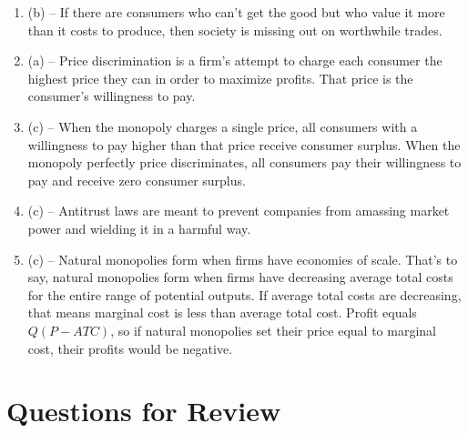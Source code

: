 \documentclass{article}
\begin{document}
\begin{enumerate}
\item (b) -- If there are consumers who can't get the good but who value it more than it costs to produce, then society is missing out on worthwhile trades. 

\item (a) -- Price discrimination is a firm's attempt to charge each consumer the highest price they can in order to maximize profits. That price is the consumer's willingness to pay. 

\item (c) -- When the monopoly charges a single price, all consumers with a willingness to pay higher than that price receive consumer surplus. When the monopoly perfectly price discriminates, all consumers pay their willingness to pay and receive zero consumer surplus.

\item (c) -- Antitrust laws are meant to prevent companies from amassing market power and wielding it in a harmful way.

\item (c) -- Natural monopolies form when firms have economies of scale. That's to say, natural monopolies form when firms have decreasing average total costs for the entire range of potential outputs. If average total costs are decreasing, that means marginal cost is less than average total cost. Profit equals $Q(P - ATC)$, so if natural monopolies set their price equal to marginal cost, their profits would be negative.

\end{enumerate}

\section*{Questions for Review}
\end{document}
